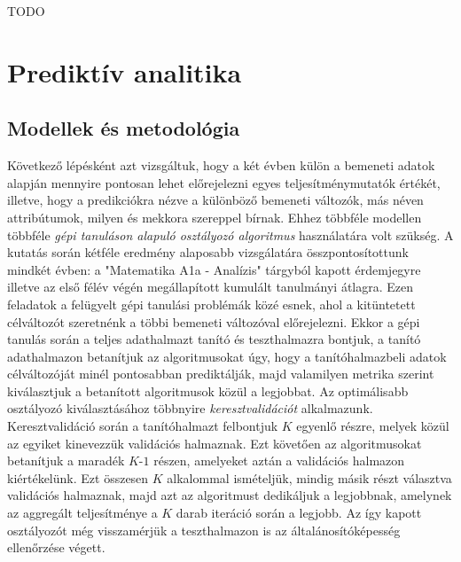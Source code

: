 \documentclass[12pt]{article}
\begin{document}
TODO


\newpage
\section{Prediktív analitika}

\subsection{Modellek és metodológia}

Következő lépésként azt vizsgáltuk, hogy a két évben külön a bemeneti adatok alapján mennyire pontosan lehet előrejelezni egyes teljesítménymutatók értékét, illetve, hogy a predikciókra nézve a különböző bemeneti változók, más néven attribútumok, milyen és mekkora szereppel bírnak. Ehhez többféle modellen többféle \textit{gépi tanuláson alapuló osztályozó algoritmus} használatára volt szükség. A kutatás során kétféle eredmény alaposabb vizsgálatára összpontosítottunk mindkét évben: a "Matematika A1a - Analízis" tárgyból kapott érdemjegyre illetve az első félév végén megállapított kumulált tanulmányi átlagra. Ezen feladatok a felügyelt gépi tanulási problémák közé esnek, ahol a kitüntetett célváltozót szeretnénk a többi bemeneti változóval előrejelezni\cite{bevadat}. Ekkor a gépi tanulás során a teljes adathalmazt tanító és teszthalmazra bontjuk, a tanító adathalmazon betanítjuk az algoritmusokat úgy, hogy a tanítóhalmazbeli adatok célváltozóját minél pontosabban prediktálják, majd valamilyen metrika szerint kiválasztjuk a betanított algoritmusok közül a legjobbat. Az optimálisabb osztályozó kiválasztásához többnyire \textit{keresztvalidációt} alkalmazunk. Keresztvalidáció során a tanítóhalmazt felbontjuk $K$ egyenlő részre, melyek közül az egyiket kinevezzük validációs halmaznak. Ezt követően az algoritmusokat betanítjuk a maradék $K$-$1$ részen, amelyeket aztán a validációs halmazon kiértékelünk. Ezt összesen $K$ alkalommal ismételjük, mindig másik részt választva validációs halmaznak, majd azt az algoritmust dedikáljuk a legjobbnak, amelynek az aggregált teljesítménye a $K$ darab iteráció során a legjobb. Az így kapott osztályozót még visszamérjük a teszthalmazon is az általánosítóképesség ellenőrzése végett. %
\end{document}
